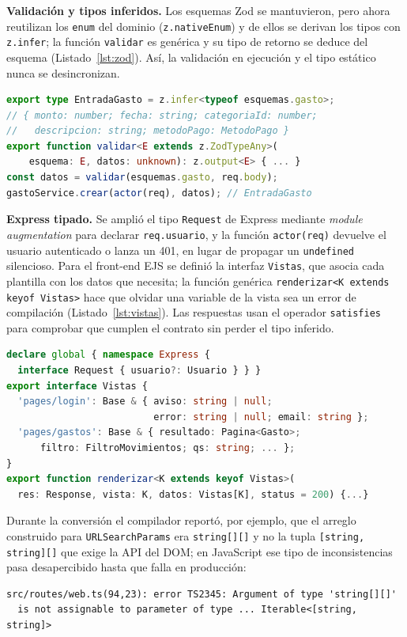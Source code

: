 \documentclass[conference,a4paper]{IEEEtran}
\begin{document}
\textbf{Validación y tipos inferidos.} Los esquemas Zod se mantuvieron, pero ahora reutilizan los \texttt{enum} del dominio (\texttt{z.nativeEnum}) y de ellos se derivan los tipos con \texttt{z.infer}; la función \texttt{validar} es genérica y su tipo de retorno se deduce del esquema (Listado~\ref{lst:zod}). Así, la validación en ejecución y el tipo estático nunca se desincronizan.

\begin{lstlisting}[language=TypeScript, caption={Tipos derivados de la validación y validador genérico}, label={lst:zod}]
export type EntradaGasto = z.infer<typeof esquemas.gasto>;
// { monto: number; fecha: string; categoriaId: number;
//   descripcion: string; metodoPago: MetodoPago }
export function validar<E extends z.ZodTypeAny>(
    esquema: E, datos: unknown): z.output<E> { ... }
const datos = validar(esquemas.gasto, req.body);
gastoService.crear(actor(req), datos); // EntradaGasto
\end{lstlisting}

\textbf{Express tipado.} Se amplió el tipo \texttt{Request} de Express mediante \emph{module augmentation} para declarar \texttt{req.usuario}, y la función \texttt{actor(req)} devuelve el usuario autenticado o lanza un 401, en lugar de propagar un \texttt{undefined} silencioso. Para el front-end EJS se definió la interfaz \texttt{Vistas}, que asocia cada plantilla con los datos que necesita; la función genérica \texttt{renderizar<K extends keyof Vistas>} hace que olvidar una variable de la vista sea un error de compilación (Listado~\ref{lst:vistas}). Las respuestas usan el operador \texttt{satisfies} para comprobar que cumplen el contrato sin perder el tipo inferido.

\begin{lstlisting}[language=TypeScript, caption={Ampliación de Express y render tipado de vistas EJS}, label={lst:vistas}]
declare global { namespace Express {
  interface Request { usuario?: Usuario } } }
export interface Vistas {
  'pages/login': Base & { aviso: string | null;
                          error: string | null; email: string };
  'pages/gastos': Base & { resultado: Pagina<Gasto>;
      filtro: FiltroMovimientos; qs: string; ... };
}
export function renderizar<K extends keyof Vistas>(
  res: Response, vista: K, datos: Vistas[K], status = 200) {...}
\end{lstlisting}

Durante la conversión el compilador reportó, por ejemplo, que el arreglo construido para \texttt{URLSearchParams} era \texttt{string[][]} y no la tupla \texttt{[string, string][]} que exige la API del DOM; en JavaScript ese tipo de inconsistencias pasa desapercibido hasta que falla en producción:
\begin{lstlisting}[basicstyle=\ttfamily\tiny]
src/routes/web.ts(94,23): error TS2345: Argument of type 'string[][]'
  is not assignable to parameter of type ... Iterable<[string, string]>
\end{lstlisting}
\end{document}
